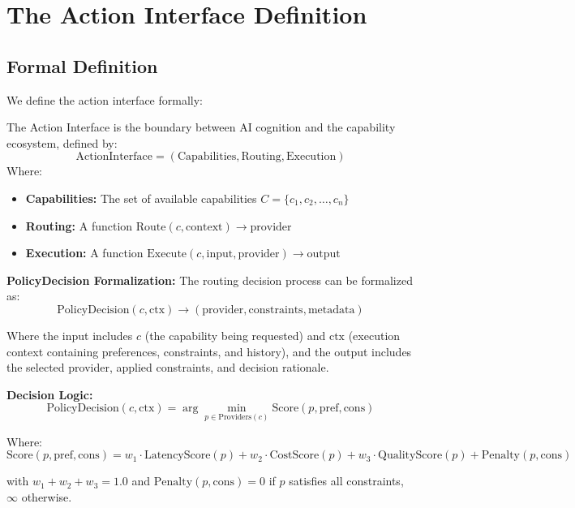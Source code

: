\section{The Action Interface Definition}

\subsection{Formal Definition}

We define the action interface formally:

\begin{definition}
The Action Interface is the boundary between AI cognition and the capability ecosystem, defined by:
\[
\text{ActionInterface} = (\text{Capabilities}, \text{Routing}, \text{Execution})
\]
Where:
\begin{itemize}[leftmargin=*]
\item \textbf{Capabilities:} The set of available capabilities $C = \{c_1, c_2, \ldots, c_n\}$
\item \textbf{Routing:} A function $\text{Route}(c, \text{context}) \to \text{provider}$
\item \textbf{Execution:} A function $\text{Execute}(c, \text{input}, \text{provider}) \to \text{output}$
\end{itemize}
\end{definition}

\textbf{PolicyDecision Formalization:} The routing decision process can be formalized as:
\[
\text{PolicyDecision}(c, \text{ctx}) \to (\text{provider}, \text{constraints}, \text{metadata})
\]

Where the input includes $c$ (the capability being requested) and $\text{ctx}$ (execution context containing preferences, constraints, and history), and the output includes the selected provider, applied constraints, and decision rationale.

\textbf{Decision Logic:}
\[
\text{PolicyDecision}(c, \text{ctx}) = \arg\min_{p \in \text{Providers}(c)} \text{Score}(p, \text{pref}, \text{cons})
\]

Where:
\[
\text{Score}(p, \text{pref}, \text{cons}) = w_1 \cdot \text{LatencyScore}(p) + w_2 \cdot \text{CostScore}(p) + w_3 \cdot \text{QualityScore}(p) + \text{Penalty}(p, \text{cons})
\]

with $w_1 + w_2 + w_3 = 1.0$ and $\text{Penalty}(p, \text{cons}) = 0$ if $p$ satisfies all constraints, $\infty$ otherwise.

